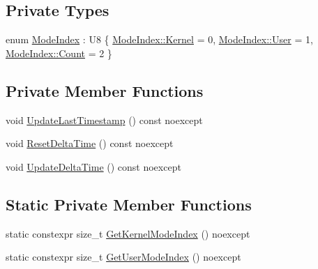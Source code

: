 \subsection*{Private Types}
\begin{DoxyCompactItemize}
\item 
enum \hyperlink{classmage_1_1_c_p_u_timer_a220f69be8f304f6fad61ccb358d278fa}{Mode\+Index} \+: U8 \{ \hyperlink{classmage_1_1_c_p_u_timer_a220f69be8f304f6fad61ccb358d278faa6ff9f4444ac481652f4412b5e1623846}{Mode\+Index\+::\+Kernel} = 0, 
\hyperlink{classmage_1_1_c_p_u_timer_a220f69be8f304f6fad61ccb358d278faa8f9bfe9d1345237cb3b2b205864da075}{Mode\+Index\+::\+User} = 1, 
\hyperlink{classmage_1_1_c_p_u_timer_a220f69be8f304f6fad61ccb358d278faae93f994f01c537c4e2f7d8528c3eb5e9}{Mode\+Index\+::\+Count} = 2
 \}
\end{DoxyCompactItemize}
\subsection*{Private Member Functions}
\begin{DoxyCompactItemize}
\item 
void \hyperlink{classmage_1_1_c_p_u_timer_aa956ede1a12c0c383e7fcc53e6f8c405}{Update\+Last\+Timestamp} () const noexcept
\item 
void \hyperlink{classmage_1_1_c_p_u_timer_acb1a264ae09cea3d96794e3c0af246e7}{Reset\+Delta\+Time} () const noexcept
\item 
void \hyperlink{classmage_1_1_c_p_u_timer_a4e82f7003a11e109495b7450e2f82f4f}{Update\+Delta\+Time} () const noexcept
\end{DoxyCompactItemize}
\subsection*{Static Private Member Functions}
\begin{DoxyCompactItemize}
\item 
static constexpr size\+\_\+t \hyperlink{classmage_1_1_c_p_u_timer_ae13da8e25167ec92802d272901e2598c}{Get\+Kernel\+Mode\+Index} () noexcept
\item 
static constexpr size\+\_\+t \hyperlink{classmage_1_1_c_p_u_timer_a457d65db3cb67775971e2750755ad403}{Get\+User\+Mode\+Index} () noexcept
\end{DoxyCompactItemize}
